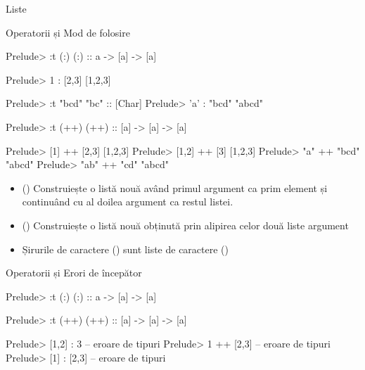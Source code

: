 \documentclass[handout,xcolor=pdftex,romanian,colorlinks]{beamer}
\begin{document}
\begin{section}{Liste}

\begin{frame}[fragile]{Operatorii \structure{:} și \structure{++}}{Mod de folosire}
\vspace{-3ex}
\begin{minipage}[t]{.49\columnwidth}
\begin{asciihs}
Prelude> :t (:)
(:) :: a -> [a] -> [a]

Prelude> 1 : [2,3]
[1,2,3]


Prelude> :t "bcd"
"bc" :: [Char]
Prelude> 'a' : "bcd"
"abcd"
\end{asciihs}
\end{minipage}
\begin{minipage}[t]{.49\columnwidth}
\begin{asciihs}
Prelude> :t (++)
(++) :: [a] -> [a] -> [a]

Prelude> [1] ++ [2,3]
[1,2,3]
Prelude> [1,2] ++ [3]
[1,2,3]
Prelude> "a" ++ "bcd"
"abcd"
Prelude> "ab" ++ "cd"
"abcd"
\end{asciihs}
\end{minipage}
\begin{itemize}
\item[:] () Construiește o listă nouă având primul argument ca prim element și continuând cu al doilea argument ca restul listei.
\item[++] () Construiește o listă nouă obținută prin alipirea celor două liste argument
\item[\texttt{\footnotesize [Char]}] Șirurile de caractere () sunt liste de caractere ()
\end{itemize}

\end{frame}

\begin{frame}[fragile]{Operatorii \structure{:} și \structure{++}}{Erori de începător}
\begin{asciihs}
Prelude> :t (:)
(:) :: a -> [a] -> [a]

Prelude> :t (++)
(++) :: [a] -> [a] -> [a]

\end{asciihs}

\begin{minipage}[t]{.49\columnwidth}
\begin{asciihs}
Prelude> [1,2] : 3
  -- eroare de tipuri
Prelude> 1 ++ [2,3]
  -- eroare de tipuri
Prelude> [1] : [2,3]
  -- eroare de tipuri
\end{asciihs}


\end{minipage}
\end{frame}
\end{section}
\end{document}
